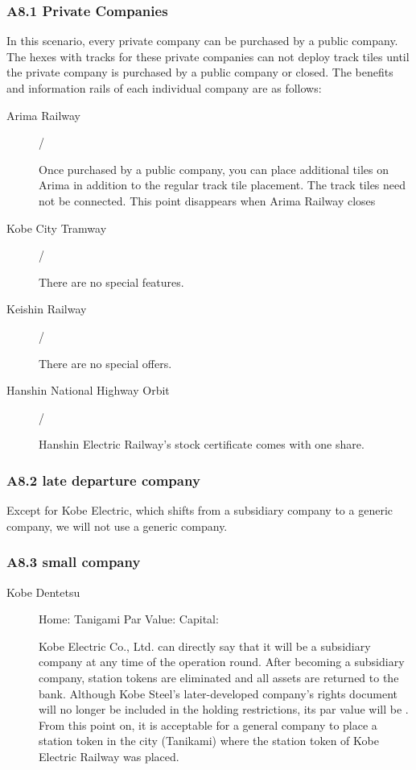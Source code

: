 \documentclass{article}
\begin{document}
\begin{CJK}{UTF8}{min}
\subsubsection*{A8.1 Private Companies}

In this scenario, every private company can be purchased by a public
company. The hexes with tracks for these private companies can not
deploy track tiles until the private company is purchased by a public
company or closed. The benefits and information rails of each
individual company are as follows:

\begin{description}
\item[Arima Railway]  / 

Once purchased by a public company, you can
place additional tiles on Arima in addition to the regular track tile
placement. The track tiles need not be connected. This point
disappears when Arima Railway closes

\item[Kobe City Tramway]  / 

There are no special features.

\item[Keishin Railway]   / 

There are no special offers.

\item[Hanshin National Highway Orbit]  / 

Hanshin Electric Railway's stock certificate comes with one share.
\end{description}

\subsubsection*{A8.2 late departure company}

Except for Kobe Electric, which shifts from a subsidiary company to a
generic company, we will not use a generic company.

\subsubsection*{A8.3 small company}
\begin{description}
\item[Kobe Dentetsu] Home: Tanigami Par Value:  Capital: 

Kobe Electric Co., Ltd. can directly say that it will be a subsidiary
company at any time of the operation round. After becoming a
subsidiary company, station tokens are eliminated and all assets are
returned to the bank. Although Kobe Steel's later-developed company's
rights document will no longer be included in the holding
restrictions, its par value will be . From this point on, it is
acceptable for a general company to place a station token in the city
(Tanikami) where the station token of Kobe Electric Railway was
placed.
\end{description}


\end{CJK}
\end{document}
